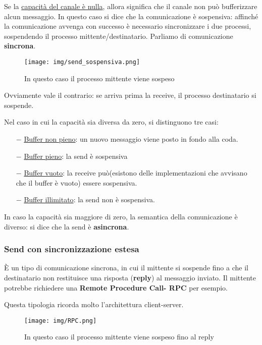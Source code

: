 \documentclass{article}
\begin{document}
\noindent Se la \underline{capacità del canale è nulla},
 allora significa che il canale non può bufferizzare alcun
messaggio. In questo caso si dice che la comunicazione è sospensiva:
affinché la comunicazione avvenga con successo è necessario
sincronizzare i due processi, sospendendo il processo mittente/destinatario.
Parliamo di comunicazione \textbf{sincrona}.


\begin{figure}[h!]
    \begin{center}
        \texttt{[image: img/send\_sospensiva.png]}  
        \caption{In questo caso il processo mittente viene sospeso}
    \end{center}
\end{figure}

\noindent Ovviamente vale il contrario: se arriva prima la receive, il 
processo destinatario si sospende.
\medskip

\noindent Nel caso in cui la capacità sia diversa da zero, si 
distinguono tre casi:
\begin{itemize}
    \item[$-$] \underline{Buffer non pieno}: un nuovo messaggio viene
    posto in fondo alla coda.  
    \item[$-$] \underline{Buffer pieno}: la send è sospensiva
    \item[$-$] \underline{Buffer vuoto}: la receive può(esistono
    delle implementazioni che avvisano che il buffer è vuoto) essere 
    sospensiva.   
    \item[$-$] \underline{Buffer illimitato}: la send non è
    sospensiva. 
\end{itemize}


\noindent In caso la capacità sia maggiore di zero, la semantica della 
comunicazione è diverso: si dice che la send è \textbf{asincrona}.
\pagebreak

\subsubsection{Send con sincronizzazione estesa}
È un tipo di comunicazione sincrona, in cui il
mittente si sospende fino a che il destinatario non
restituisce una risposta (\textbf{reply}) al messaggio 
inviato. Il mittente potrebbe richiedere una \textbf{Remote Procedure
Call- RPC} per esempio.
\medskip

\noindent Questa tipologia ricorda molto l'architettura client-server. 

\begin{figure}[h!]
    \begin{center}
        \texttt{[image: img/RPC.png]}  
        \caption{In questo caso il processo mittente viene sospeso fino al reply}
    \end{center}
\end{figure}
\end{document}
